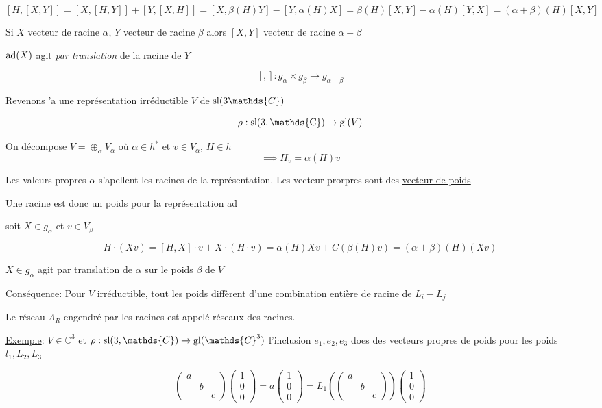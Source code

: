 \[ [H, [X, Y] ] = [X, [H, Y] ] + [Y, [X, H] ] = [X, \beta(H) Y] - [Y, \alpha(H)X] =  \beta(H) [X, Y] - \alpha(H) [Y, X] = \left( \alpha + \beta \right) (H) [X, Y]   \]


Si \(X\) vecteur de racine \(\alpha\), \(Y\) vecteur de racine \(\beta\) alors \([X, Y] \) vecteur de racine \(\alpha + \beta\)

\({\rm{}ad}(X) \) agit \textit{par translation} de la racine de \(Y\)

\[ [{}, {}]: g_{\alpha} \times  g_{\beta} \to g_{\alpha+\beta}  \]

Revenons 'a une représentation irréductible \(V\) de \({\rm{}sl}(3 \mathds{C})\)

\[ \rho: {\rm{}sl(3, \mathds{C})} \to {\rm{}gl}(V) \]


On décompose \(V = \oplus_{\alpha} V_{\alpha}  \) où \(\alpha \in h ^{*}\) et \(v \in V_{\alpha} \), \( H \in h\)
\[ \implies H_v = \alpha(H) v \]

Les valeurs propres \(\alpha\) s'apellent les racines de la représentation. Les vecteur prorpres sont des \underline{vecteur de poids} 


Une racine est donc un poids pour la représentation ad

soit \(X \in g_{\alpha} \) et \(v \in V_{\beta} \)

\[ H \cdot (Xv) = [H, X] \cdot v + X \cdot (H \cdot v) = \alpha(H) Xv + C(\beta(H) v) = \left( \alpha + \beta \right) (H) (Xv ) \]

\(X \in g_{\alpha} \) agit par translation de \(\alpha\) sur le poids \(\beta\) de \(V\)

\underline{Conséquence:} Pour \(V\) irréductible, tout les poids diffèrent d'une combination entière de racine de \(L_i - L_j \) 

Le réseau \(\Lambda_R\) engendré par les racines est appelé réseaux des racines. 

\underline{Exemple}: 
\(V \in \mathds{C}^3 \) et \(\rho: {\rm{}sl}(3, \mathds{C}) \to {\rm{}gl}(\mathds{C}^3) \) l'inclusion  
\(e_1 , e_2 , e_3\) does des vecteurs propres de poids pour les poids \(l_1, L_2 , L_3 \)

\[ \begin{pmatrix} a \\ & b \\ &&c  \end{pmatrix} \begin{pmatrix} 1 \\0 \\0  \end{pmatrix} = a \begin{pmatrix} 1 \\0 \\0 \end{pmatrix} = L_1 (\begin{pmatrix} a\\&b \\&&c \end{pmatrix} ) \begin{pmatrix} 1 \\0 \\0  \end{pmatrix}  \]

